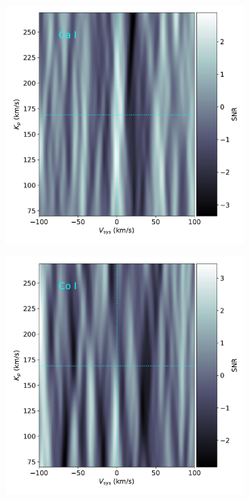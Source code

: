 \documentclass[twocolumn]{aastex631}
\begin{document}
\begin{figure}[ht!]
\begin{subfigure}[b]{0.3\textwidth}
                \end{subfigure}
                \begin{subfigure}[b]{0.3\textwidth}
                    \centering
                    \includegraphics[width=\textwidth]{plots-updated/kp-vsys-map/combined/KELT-20b.20190504.combined.Ca.CCFs-shifted.pdf}
                \end{subfigure}
                \begin{subfigure}[b]{0.3\textwidth}
                    \centering
                    \includegraphics[width=\textwidth]{plots-updated/kp-vsys-map/combined/KELT-20b.20190504.combined.Co.CCFs-shifted.pdf}

\end{subfigure}
\end{figure}
\end{document}
